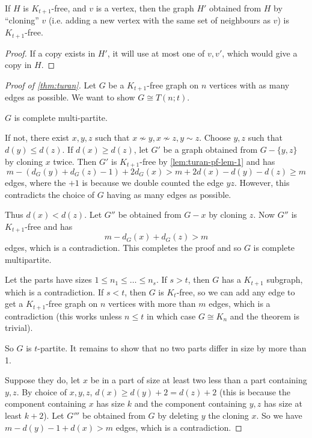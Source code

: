 \documentclass[main.tex]{subfiles}
\begin{document}
\begin{lemma}
  \th\label{lem:turan-pf-lem-1}
  If $H$ is $K_{t+1}$-free, and $v$ is a vertex, then the graph $H'$ obtained
  from $H$ by ``cloning'' $v$ (i.e. adding a new vertex with the same set of
  neighbours as $v$) is $K_{t+1}$-free.
\end{lemma}
\begin{proof}
  If a copy exists in $H'$, it will use at most one of $v,v'$,
  which would give a copy in $H$.
\end{proof}

\begin{proof}[Proof of \th\ref{thm:turan}]
  Let $G$ be a $K_{t+1}$-free graph on $n$ vertices with as many edges as possible.
  We want to show $G\cong T(n;t)$.

  \begin{claim}
    $G$ is complete multi-partite.
  \end{claim}
  \begin{subproof}
    If not, there exist $x,y,z$ such that $x\not\sim y, x\not\sim z, y\sim z$.
    Choose $y,z$ such that $d(y)\leq d(z)$.
    If $d(x)\geq d(z)$, let $G'$ be a graph obtained from $G - \{y,z\}$
    by cloning $x$ twice.
    Then $G'$ is $K_{t+1}$-free by \th\ref{lem:turan-pf-lem-1} and has
    \[
      m - (d_G(y) + d_G(z) - 1) + 2d_G(x)
      > m + 2d(x) - d(y) - d(z)\geq m
    \]
    edges, where the $+1$ is because we double counted the edge $yz$.
    However, this contradicts the choice of $G$ having as many edges as possible.

    Thus $d(x) < d(z)$.
    Let $G''$ be obtained from $G - x$ by cloning $z$.
    Now $G''$ is $K_{t+1}$-free and has
    \[
      m - d_G(x) + d_G(z) > m
    \]
    edges, which is a contradiction.
    This completes the proof and so $G$ is complete multipartite.
  \end{subproof}
  Let the parts have sizes $1\leq n_1\leq\ldots\leq n_s$.
  If $s > t$, then $G$ has a $K_{t+1}$ subgraph, which is a contradiction.
  If $s < t$, then $G$ is $K_t$-free, so we can add any edge to get a
  $K_{t+1}$-free graph on $n$ vertices with more than $m$ edges, which is a
  contradiction (this works unless $n\leq t$ in which case $G\cong K_n$
  and the theorem is trivial).

  So $G$ is $t$-partite.
  It remains to show that no two parts differ in size by more than 1.

  Suppose they do, let $x$ be in a part of size at least two less than a part
  containing $y,z$.
  By choice of $x,y,z$, $d(x)\geq d(y) + 2 = d(z) + 2$ (this is because the
  component containing $x$ has size $k$ and the component containing $y,z$ has
  size at least $k+2$).
  Let $G'''$ be obtained from $G$ by deleting $y$ the cloning $x$.
  So we have $m - d(y) - 1 + d(x) > m$ edges, which is a contradiction.
\end{proof}
\end{document}

